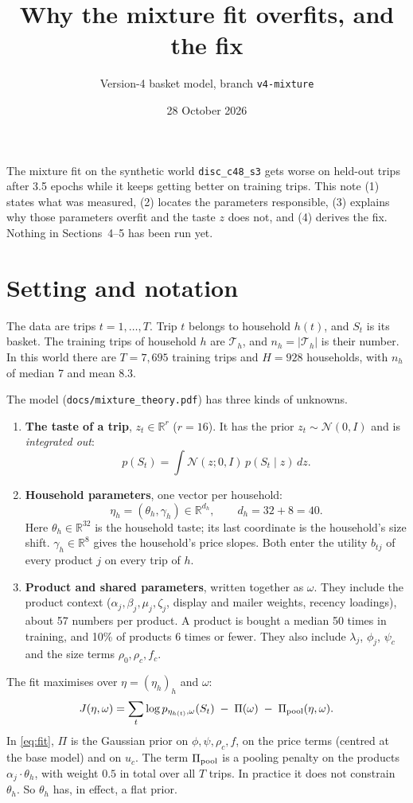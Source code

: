 \documentclass[11pt]{article}
\title{Why the mixture fit overfits, and the fix}
\author{Version-4 basket model, branch \texttt{v4-mixture}}
\date{28 October 2026}
\theoremstyle{remark}\newtheorem{remark}{Remark}
\newcommand{\R}{\mathbb{R}}
\newcommand{\N}{\mathcal{N}}
\begin{document}
\maketitle

\noindent The mixture fit on the synthetic world \texttt{disc\_c48\_s3} gets worse on held-out trips after
3.5 epochs while it keeps getting better on training trips. This note (1) states what was measured,
(2) locates the parameters responsible, (3) explains why those parameters overfit and the
taste $z$ does not, and (4) derives the fix. Nothing in Sections~4--5 has been run yet.

\section{Setting and notation}

The data are trips $t=1,\dots,T$. Trip $t$ belongs to household $h(t)$, and $S_t$ is its basket.
The training trips of household $h$ are $\mathcal T_h$, and $n_h=|\mathcal T_h|$ is their number.
In this world there are $T=7{,}695$ training trips and $H=928$ households, with $n_h$ of median 7 and mean 8.3.

The model (\texttt{docs/mixture\_theory.pdf}) has three kinds of unknowns.
\begin{enumerate}
\item \textbf{The taste of a trip}, $z_t\in\R^r$ ($r=16$). It has the prior $z_t\sim\N(0,I)$ and is
  \emph{integrated out}:
  \begin{equation}\label{eq:marg}
  p(S_t)=\int \N(z;0,I)\,p(S_t\mid z)\,dz .
  \end{equation}
\item \textbf{Household parameters}, one vector per household:
  \[\eta_h=(\theta_h,\gamma_h)\in\R^{d_h},\qquad d_h=32+8=40.\]
  Here $\theta_h\in\R^{32}$ is the household taste; its last coordinate is the household's size
  shift. $\gamma_h\in\R^8$ gives the household's price slopes. Both enter the utility $b_{tj}$ of
  every product $j$ on every trip of $h$.
\item \textbf{Product and shared parameters}, written together as $\omega$. They include the
  product context ($\alpha_j,\beta_j,\mu_j,\zeta_j$, display and mailer weights, recency loadings),
  about 57 numbers per product. A product is bought a median 50 times in training, and 10\% of
  products 6 times or fewer. They also include $\lambda_j$, $\phi_j$, $\psi_c$ and the size terms
  $\rho_0,\rho_c,f_c$.
\end{enumerate}
The fit maximises over $\eta=(\eta_h)_h$ and $\omega$:
\begin{equation}\label{eq:fit}
J(\eta,\omega)=\sum_{t}\log p_{\eta_{h(t)},\omega}(S_t)\;-\;\Pi(\omega)\;-\;\Pi_{\rm pool}(\eta,\omega).
\end{equation}
In \eqref{eq:fit}, $\Pi$ is the Gaussian prior on $\phi,\psi,\rho_c,f$, on the price terms (centred at the
base model) and on $u_c$. The term $\Pi_{\rm pool}$ is a pooling penalty on the products
$\alpha_j\cdot\theta_h$, with weight $0.5$ in total over all $T$ trips. In practice it does not
constrain $\theta_h$. So $\theta_h$ has, in effect, a flat prior.
\end{document}
